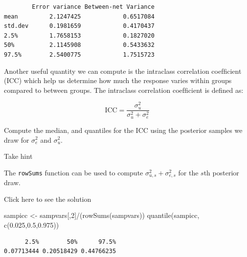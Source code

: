\documentclass[
  letterpaper,
  DIV=11,
  numbers=noendperiod]{scrartcl}
\newenvironment{Shaded}{\begin{snugshade}}{\end{snugshade}}
\newcommand{\DecValTok}[1]{\textcolor[rgb]{0.68,0.00,0.00}{#1}}
\newcommand{\FloatTok}[1]{\textcolor[rgb]{0.68,0.00,0.00}{#1}}
\newcommand{\FunctionTok}[1]{\textcolor[rgb]{0.28,0.35,0.67}{#1}}
\newcommand{\NormalTok}[1]{\textcolor[rgb]{0.00,0.23,0.31}{#1}}
\newcommand{\OtherTok}[1]{\textcolor[rgb]{0.00,0.23,0.31}{#1}}
\newcommand{\SpecialCharTok}[1]{\textcolor[rgb]{0.37,0.37,0.37}{#1}}
\begin{document}
\begin{verbatim}
        Error variance Between-net Variance
mean         2.1247425            0.6517084
std.dev      0.1981659            0.4170437
2.5%         1.7658153            0.1827020
50%          2.1145908            0.5433632
97.5%        2.5400775            1.7515723
\end{verbatim}

\begin{tcolorbox}[enhanced jigsaw, colbacktitle=quarto-callout-warning-color!10!white, breakable, toptitle=1mm, title={Task}, colback=white, leftrule=.75mm, bottomtitle=1mm, bottomrule=.15mm, coltitle=black, colframe=quarto-callout-warning-color-frame, titlerule=0mm, toprule=.15mm, arc=.35mm, opacitybacktitle=0.6, left=2mm, opacityback=0, rightrule=.15mm]

Another useful quantity we can compute is the intraclass correlation
coefﬁcient (ICC) which help us determine how much the response varies
within groups compared to between groups. The intraclass correlation
coefﬁcient is defined as:

\[
\text{ICC} = \frac{\sigma^2_u}{\sigma^2_u + \sigma^2_e}
\]

Compute the median, and quantiles for the ICC using the posterior
samples we draw for \(\sigma^2_e\) and \(\sigma^2_u\).

Take hint

The \texttt{rowSums} function can be used to compute
\(\sigma^2_{u,s} + \sigma^2_{e,s}\) for the \(s\)th posterior draw.

Click here to see the solution

\begin{Shaded}
\begin{Highlighting}[]
\NormalTok{sampicc }\OtherTok{\textless{}{-}}\NormalTok{ sampvars[,}\DecValTok{2}\NormalTok{]}\SpecialCharTok{/}\NormalTok{(}\FunctionTok{rowSums}\NormalTok{(sampvars))}
\FunctionTok{quantile}\NormalTok{(sampicc, }\FunctionTok{c}\NormalTok{(}\FloatTok{0.025}\NormalTok{,}\FloatTok{0.5}\NormalTok{,}\FloatTok{0.975}\NormalTok{))}
\end{Highlighting}
\end{Shaded}

\begin{verbatim}
      2.5%        50%      97.5% 
0.07713444 0.20518429 0.44766235 
\end{verbatim}

\end{tcolorbox}
\end{document}
